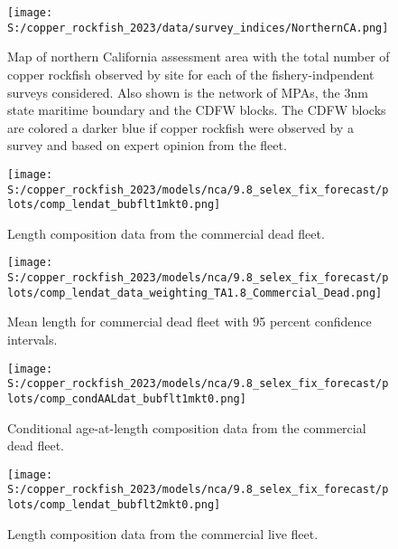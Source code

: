 \documentclass[11pt,
  english,
  letterpaper,
]{article}
\begin{document}
\FloatBarrier

\begin{figure}
\centering
\texttt{[image: S:/copper\_rockfish\_2023/data/survey\_indices/NorthernCA.png]}
\caption{Map of northern California assessment area with the total number of copper rockfish observed by site for each of the fishery-indpendent surveys considered. Also shown is the network of MPAs, the 3nm state maritime boundary and the CDFW blocks. The CDFW blocks are colored a darker blue if copper rockfish were observed by a survey and based on expert opinion from the fleet.\label{fig:survey-map}}
\end{figure}

\pagebreak

\begin{figure}
\centering
\texttt{[image: S:/copper\_rockfish\_2023/models/nca/9.8\_selex\_fix\_forecast/plots/comp\_lendat\_bubflt1mkt0.png]}
\caption{Length composition data from the commercial dead fleet.\label{fig:com-dead-len-data}}
\end{figure}

\pagebreak

\begin{figure}
\centering
\texttt{[image: S:/copper\_rockfish\_2023/models/nca/9.8\_selex\_fix\_forecast/plots/comp\_lendat\_data\_weighting\_TA1.8\_Commercial\_Dead.png]}
\caption{Mean length for commercial dead fleet with 95 percent confidence intervals.\label{fig:mean-com-dead-len-data}}
\end{figure}

\pagebreak

\begin{figure}
\centering
\texttt{[image: S:/copper\_rockfish\_2023/models/nca/9.8\_selex\_fix\_forecast/plots/comp\_condAALdat\_bubflt1mkt0.png]}
\caption{Conditional age-at-length composition data from the commercial dead fleet.\label{fig:com-dead-age-data}}
\end{figure}

\pagebreak

\begin{figure}
\centering
\texttt{[image: S:/copper\_rockfish\_2023/models/nca/9.8\_selex\_fix\_forecast/plots/comp\_lendat\_bubflt2mkt0.png]}
\caption{Length composition data from the commercial live fleet.\label{fig:com-live-len-data}}
\end{figure}
\end{document}
